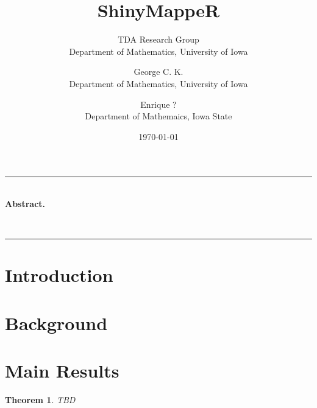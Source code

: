 \documentclass[11pt]{article}
\title{ShinyMappeR}
\author{
  TDA Research Group \\ Department of Mathematics, University of Iowa
  \and
  George C. K. \\ Department of Mathematics, University of Iowa
  \and
  Enrique ? \\ Department of Mathemaics, Iowa State
}
\date{\today}
\renewenvironment{abstract}{%
  \hfill\begin{minipage}{0.95\textwidth}
  \rule{\textwidth}{0.7pt} \\[6pt]}
  { \\[6pt]\rule{\textwidth}{1pt}\end{minipage}}
\newtheorem{theorem}{Theorem}
\begin{document}
\Large

\maketitle


\begin{abstract}
\normalsize
\textbf{Abstract.}  
  
\end{abstract}


\section{Introduction}



\section{Background}
\lipsum[2-3]


\section{Main Results}
\begin{theorem}
TBD
\end{theorem}
\end{document}
